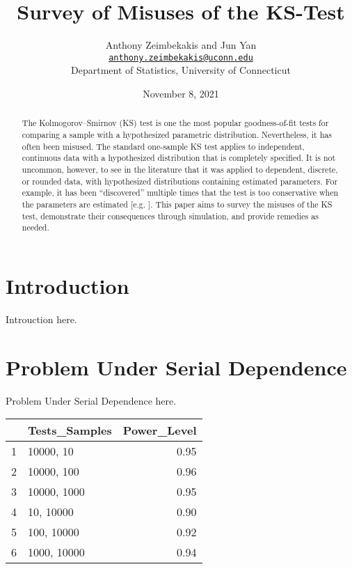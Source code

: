 \documentclass[12pt, letterpaper, titlepage]{article}
\title{Survey of Misuses of the KS-Test}
\author{Anthony Zeimbekakis and Jun Yan\\
\href{mailto:anthony.zeimbekakis@uconn.edu}{\nolinkurl{anthony.zeimbekakis@uconn.edu}}\\
Department of Statistics, University of Connecticut}
\date{November 8, 2021}
\begin{document}
\maketitle

\doublespace

\begin{abstract}
The Kolmogorov–Smirnov (KS) test is one the most popular goodness-of-fit tests for comparing a sample with a hypothesized parametric distribution. Nevertheless, it has often been misused. The standard one-sample KS test applies to independent, continuous data with a hypothesized distribution that is completely specified. It is not uncommon, however, to see in the literature that it was applied to dependent, discrete, or rounded data, with hypothesized distributions containing estimated parameters. For example, it has been “discovered” multiple times that the test is too conservative when the parameters are estimated [e.g. \citet{Steinskog}]. This paper aims to survey the misuses of the KS test, demonstrate their consequences through simulation, and provide remedies as needed.
\end{abstract}


\hypertarget{sec:intro}{%
\section{Introduction}\label{sec:intro}}

Introuction here.

\hypertarget{sec:litrev}{%
\section{Problem Under Serial Dependence}\label{sec:litrev}}

Problem Under Serial Dependence here.

\begin{table}[ht]
\centering
\begin{tabular}{rlr}
  \hline
 & Tests\_Samples & Power\_Level \\ 
  \hline
1 & 10000, 10 & 0.95 \\ 
  2 & 10000, 100 & 0.96 \\ 
  3 & 10000, 1000 & 0.95 \\ 
  4 & 10, 10000 & 0.90 \\ 
  5 & 100, 10000 & 0.92 \\ 
  6 & 1000, 10000 & 0.94 \\ 
   \hline
\end{tabular}
\end{table}
\end{document}
